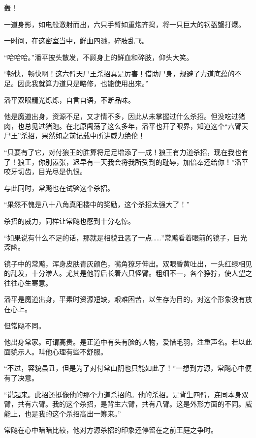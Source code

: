 
\begin{this_body}

轰！

一道身影，如电般激射而出，六只手臂如重炮齐捣，将一只巨大的钢盔蟹打爆。

一时间，在这密室当中，鲜血四溅，碎肢乱飞。

“哈哈哈。”潘平披头散发，不顾身上的鲜血和碎肢，仰头大笑。

“畅快，畅快啊！这六臂天尸王杀招真是厉害！借助尸身，规避了力道底蕴的不足。因此我就算力道只是略修，也能使用出来。”

潘平双眼精光烁烁，自言自语，不断品味。

他是魔道出身，资源不足，又才情不多，因此从未掌握过什么杀招。但没吃过猪肉，也总见过猪跑。在北原闯荡了这么多年，潘平也开了眼界，知道这个“六臂天尸王”杀招，果然如之前记载中所讲威力绝伦！

“只要有了它，对付狼王的胜算将足足增添了一成！狼王有力道杀招，现在我也有了！狼王，你别嚣张，迟早有一天我会将我所受到的耻辱，加倍奉还给你！”潘平咬牙切齿，目光尽是仇恨。

与此同时，常飚也在试验这个杀招。

“果然不愧是八十八角真阳楼中的奖励，这个杀招太强大了！”

杀招的威力，同样让常飚也感到十分吃惊。

“如果说有什么不足的话，那就是相貌丑恶了一点……”常飚看着眼前的镜子，目光深幽。

镜子中的常飚，浑身皮肤青灰颜色，嘴角獠牙伸出。双眼昏黄吐出，一头红绿相见的乱发，十分渗人。尤其是他背后长着六只怪臂。粗细不一，各个狰狞，使人望之往往心生寒意。

潘平是魔道出身，平素时资源短缺，艰难困苦，以生存为目的，对这个形象没有放在心上。

但常飚不同。

他出身常家。可谓高贵。是正道中有头有脸的人物，爱惜毛羽，注重声名。若以此面貌示人。叫他心理有些不舒服。

“不过，容貌虽丑，但是为了对付常山阴也只能如此了！”一想到方源，常飚心中便有了决意。

“说起来。此招还挺像他的那个力道杀招的。他的杀招。是背生四臂，连同本身双臂，共有六臂。我的这个杀招，是背生六臂，共有八臂。这是外形方面的不同。威能上，也是我的这个杀招高出一筹来。”

常飚在心中暗暗比较，他对方源杀招的印象还停留在之前王庭之争时。


\end{this_body}
